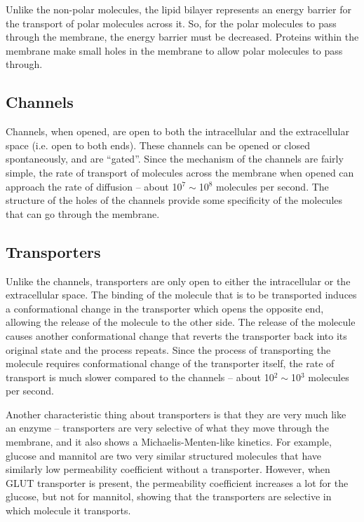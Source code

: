 Unlike the non-polar molecules, the lipid bilayer represents an energy barrier for the transport of polar molecules across it.
So, for the polar molecules to pass through the membrane, the energy barrier must be decreased.
Proteins within the membrane make small holes in the membrane to allow polar molecules to pass through.

\subsection{Channels}

Channels, when opened, are open to both the intracellular and the extracellular space (i.e. open to both ends).
These channels can be opened or closed spontaneously, and are ``gated''.
Since the mechanism of the channels are fairly simple, the rate of transport of molecules across the membrane when opened can approach the rate of diffusion -- about 10$^7\sim$10$^8$ molecules per second.
The structure of the holes of the channels provide some specificity of the molecules that can go through the membrane.

\subsection{Transporters}

Unlike the channels, transporters are only open to either the intracellular or the extracellular space.
The binding of the molecule that is to be transported induces a conformational change in the transporter which opens the opposite end, allowing the release of the molecule to the other side.
The release of the molecule causes another conformational change that reverts the transporter back into its original state and the process repeats.
Since the process of transporting the molecule requires conformational change of the transporter itself, the rate of transport is much slower compared to the channels -- about 10$^2\sim$10$^3$ molecules per second.

Another characteristic thing about transporters is that they are very much like an enzyme -- transporters are very selective of what they move through the membrane, and it also shows a Michaelis-Menten-like kinetics.
For example, glucose and mannitol are two very similar structured molecules that have similarly low permeability coefficient without a transporter.
However, when GLUT transporter is present, the permeability coefficient increases a lot for the glucose, but not for mannitol, showing that the transporters are selective in which molecule it transports.

